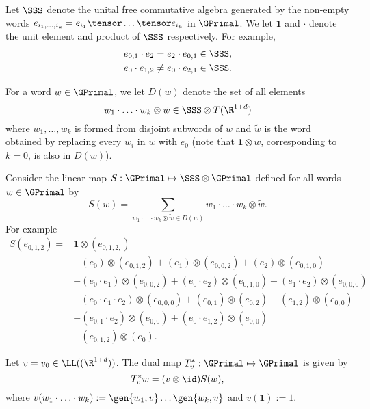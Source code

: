 \documentclass{article}
\begin{document}

Let $\SSS$ denote the unital free commutative algebra generated by the non-empty words $e_{i_1,\ldots,i_k} = e_{i_1}\tensor \ldots\tensor e_{i_k}$ in $\GPrimal$. We let $\mathbf{1}$ and $\cdot$ denote the unit element and product of $\SSS$ respectively. For example, 
\begin{align*}
e_{0,1} \cdot e_2 &= e_2 \cdot e_{0,1} \in \SSS, \\
e_0 \cdot e_{1,2} &\ne e_0 \cdot  e_{2,1} \in \SSS.
\end{align*}


For a word $w \in \GPrimal$, we let $D(w)$ denote the set of all elements
\[
w_1\cdot\ldots \cdot w_k \otimes \tilde w \in \SSS \otimes T(\R^{1+d})
\]
where $w_1,\ldots,w_k$ is formed from disjoint subwords of $w$ and $\tilde w$ is the word obtained by replacing every $w_i$ in $w$ with $e_0$ (note that $\mathbf{1} \otimes w$, corresponding to $k=0$, is also in $D(w)$).


Consider the linear map $S : \GPrimal \mapsto \SSS \otimes \GPrimal$ defined for all words $w \in \GPrimal$ by
\[
S(w) = \sum_{w_1\cdot\ldots \cdot w_k \otimes \tilde w \in D(w)} w_1\cdot\ldots \cdot w_k \otimes \tilde w.
\]
For example
\begin{align*}
S(e_{0,1,2}) =& \mathbf{1} \otimes (e_{0,1,2,}) \\
&+ (e_0)\otimes (e_{0,1,2}) + (e_1)\otimes(e_{0,0,2}) + (e_2) \otimes (e_{0,1,0}) \\
&+ (e_0 \cdot e_1) \otimes (e_{0,0,2}) + (e_0 \cdot e_2)\otimes (e_{0,1,0}) + (e_1 \cdot e_2) \otimes (e_{0,0,0}) \\
&+ (e_0 \cdot e_1 \cdot e_2)\otimes (e_{0,0,0}) + (e_{0,1})\otimes (e_{0,2}) + (e_{1,2}) \otimes (e_{0,0}) \\
&+ (e_{0,1} \cdot e_2) \otimes (e_{0,0}) + (e_0 \cdot e_{1,2}) \otimes (e_{0,0}) \\
&+ (e_{0,1,2}) \otimes (e_0).
\end{align*}


\begin{proposition}\label{prop:adjointTv}
Let $v = v_0 \in \LL((\R^{1+d}))$. The dual map $T_v^* : \GPrimal \mapsto \GPrimal$ is given by
\[
T_v^* w = (v \otimes \id) S(w),
\]
where $v(w_1 \cdot \ldots \cdot w_k) := \gen{w_1,v}\ldots\gen{w_k, v}$ and $v(\mathbf{1}) := 1$.
\end{proposition}
\end{document}

